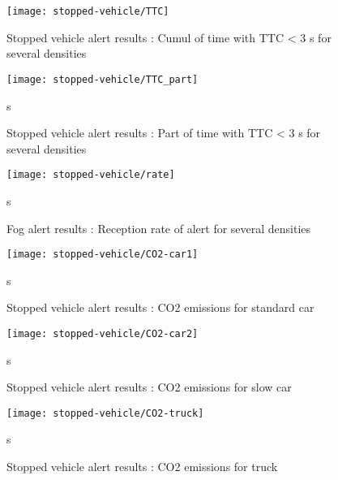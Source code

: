 \documentclass[a4paper,10pt]{report}
\begin{document}
\begin{figure}
    \begin{center}
         \texttt{[image: stopped-vehicle/TTC]}
    \end{center}
  \caption{ Stopped vehicle alert results : Cumul of time with TTC < 3 s for several densities }
  \label{fig:ttc_part}
\end{figure}

\begin{figure}
    \begin{center}
         \texttt{[image: stopped-vehicle/TTC\_part]}
    \end{center}s
  \caption{ Stopped vehicle alert results : Part of time with TTC < 3 s for several densities}
  \label{fig:ttc_part}
\end{figure}

\begin{figure}
    \begin{center}
         \texttt{[image: stopped-vehicle/rate]}
    \end{center}s
  \caption{ Fog alert results : Reception rate of alert for several densities}
  \label{fig:ttc_part}
\end{figure}


\begin{figure}
    \begin{center}
         \texttt{[image: stopped-vehicle/CO2-car1]}
    \end{center}s
  \caption{ Stopped vehicle alert results : CO2 emissions for standard car}
  \label{fig:ttc_part}
\end{figure}


\begin{figure}
    \begin{center}
         \texttt{[image: stopped-vehicle/CO2-car2]}
    \end{center}s
  \caption{ Stopped vehicle alert results : CO2 emissions for slow car}
  \label{fig:ttc_part}
\end{figure}


\begin{figure}
    \begin{center}
         \texttt{[image: stopped-vehicle/CO2-truck]}
    \end{center}s
  \caption{ Stopped vehicle alert results : CO2 emissions for truck}
  \label{fig:ttc_part}
\end{figure}
\end{document}
